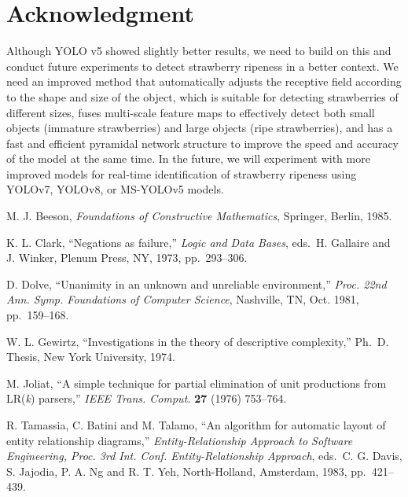 \documentclass{ws-ijprai}
\begin{document}
\section{Acknowledgment}

Although YOLO v5 showed slightly better results, we need to build on this and conduct future experiments to detect strawberry ripeness in a better context. We need an improved method that automatically adjusts the receptive field according to the shape and size of the object, which is suitable for detecting strawberries of different sizes, fuses multi-scale feature maps to effectively detect both small objects (immature strawberries) and large objects (ripe strawberries), and has a fast and efficient pyramidal network structure to improve the speed and accuracy of the model at the same time. In the future, we will experiment with more improved models for real-time identification of strawberry ripeness using YOLOv7, YOLOv8, or MS-YOLOv5 models. 







\begin{thebibliography}{0}
 M. J. Beeson, {\it Foundations of Constructive
Mathematics}, Springer, Berlin, 1985.

 K. L. Clark, ``Negations as failure,''
{\it Logic and Data Bases}, eds.~H. Gallaire and\break
J. Winker, Plenum Press, NY, 1973, pp.~293--306.

 D. Dolve, ``Unanimity in an unknown and unreliable
environment,'' {\it Proc. 22nd Ann. Symp. Foundations of
Computer Science}, Nashville, TN, Oct. 1981, pp.~159--168.

 W. L. Gewirtz, ``Investigations in the theory of
descriptive complexity,'' Ph.~D. Thesis, New York University, 1974.

 M. Joliat, ``A simple technique for partial elimination of
unit productions from LR({\it k}) parsers,'' {\it IEEE Trans. Comput.} {\bf 27} (1976) 753--764.

 R. Tamassia, C. Batini and M. Talamo,
``An algorithm for automatic layout of entity relationship diagrams,''
{\it Entity-Relationship Approach to Software Engineering,
Proc. 3rd Int. Conf. Entity-Relationship Approach}, eds.~C. G. Davis,
S. Jajodia, P. A. Ng and R. T. Yeh, North-Holland, Amsterdam, 1983,
pp.~421--439.

\end{thebibliography}
\end{document}

